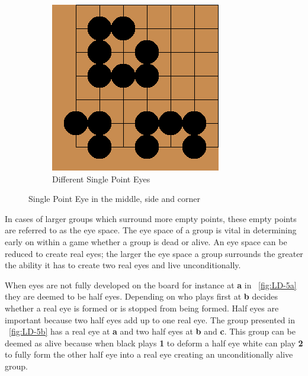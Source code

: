 \documentclass{l4proj}
\newcommand{\bo}[1]{\textbf{#1}}
\begin{document}
\begin{figure}[!ht]
\centering
\begin{subfigure}[b]{0.3\textwidth}
\includegraphics[width=\textwidth]{LD/4.png}
\caption{Different Single Point Eyes}
\label{fig:LD-4a}
\end{subfigure}
\caption{Single Point Eye in the middle, side and corner}
\label{fig:LD-4}
\end{figure}



In cases of larger groups which surround more empty points, these empty points are referred to as the eye space. The eye space of a group is vital in determining early on within a game whether a group is dead or alive. An eye space can be reduced to create real eyes; the larger the eye space a group surrounds the greater the ability it has to create two real eyes and live unconditionally.

When eyes are not fully developed on the board for instance at \bo{a} in ~\autoref{fig:LD-5a} they are deemed to be half eyes. Depending on who plays first at \bo{b} decides whether a real eye is formed or is stopped from being formed. Half eyes are important because two half eyes add up to one real eye.  The group presented in ~\autoref{fig:LD-5b} has a real eye at \bo{a} and two half eyes at \bo{b} and \bo{c}. This group can be deemed as alive because when black plays \bo{1} to deform a half eye white can play \bo{2} to fully form the other half eye into a real eye creating an unconditionally alive group.
\end{document}
